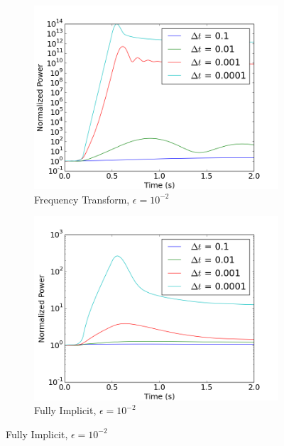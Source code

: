 \documentclass[12pt]{report}
\begin{document}
		\begin{figure}[ht]
			\centering
			\begin{subfigure}{.5\textwidth}
				\centering
				\includegraphics[width=.95\linewidth]{figs/power_case2_conv1.png}
				\caption{Frequency Transform, $\epsilon = 10^{-2}$}
				\label{fig::power_2_1_ft}
			\end{subfigure}%
			\begin{subfigure}{.5\textwidth}
				\centering
				\includegraphics[width=.95\linewidth]{figs/power_case2_conv1_omega0.png}
				\caption{Fully Implicit, $\epsilon = 10^{-2}$}
				\label{fig::power_2_1_fi}
			\end{subfigure}
			

\end{figure}
\end{document}
